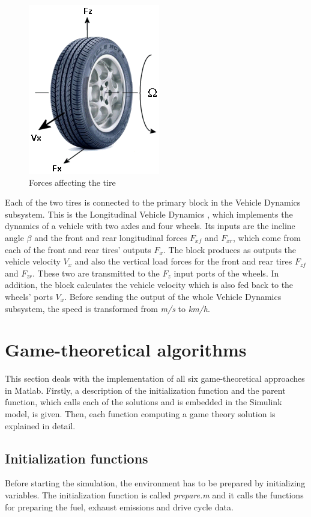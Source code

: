 \begin{figure}[h]
\centering
\includegraphics[scale=0.5]{figures/tire}
\caption{Forces affecting the tire \citep{tireMatlab}}
\label{fig:tire}
\end{figure}

Each of the two tires is connected to the primary block in the Vehicle Dynamics subsystem. This is the Longitudinal Vehicle Dynamics \citep{vehicleDynMatlab}, which implements the dynamics of a vehicle with two axles and four wheels. Its inputs are the incline angle $\beta$ and the front and rear longitudinal forces $F_{xf}$ and $F_{xr}$, which come from each of the front and rear tires' outputs $F_x$. The block produces as outputs the vehicle velocity $V_x$ and also the vertical load forces for the front and rear tires $F_{zf}$ and $F_{zr}$. These two are transmitted to the $F_z$ input ports of the wheels. In addition, the block calculates the vehicle velocity which is also fed back to the wheels' ports $V_x$. Before sending the output of the whole Vehicle Dynamics subsystem, the speed is transformed from \textit{m/s} to \textit{km/h}.

\section{Game-theoretical algorithms}
This section deals with the implementation of all six game-theoretical approaches in Matlab. Firstly, a description of the initialization function and the parent function, which calls each of the solutions and is embedded in the Simulink model, is given. Then, each function computing a game theory solution is explained in detail.

\subsection{Initialization functions}
\label{sec:initfunc}
Before starting the simulation, the environment has to be prepared by initializing variables. The initialization function is called \textit{prepare.m} and it calls the functions for preparing the fuel, exhaust emissions and drive cycle data. 

